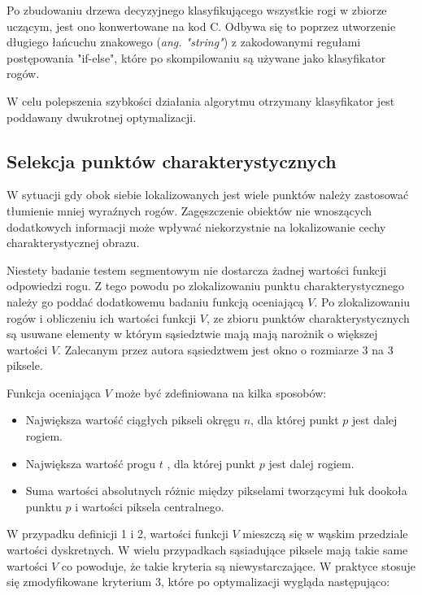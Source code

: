 Po zbudowaniu drzewa decyzyjnego klasyfikującego wszystkie rogi w zbiorze uczącym, jest ono konwertowane na kod C. Odbywa się to poprzez utworzenie długiego łańcuchu znakowego (\textit{ang. "string"}) z zakodowanymi regułami postępowania "if-else", które po skompilowaniu są używane jako klasyfikator rogów. 

W celu polepszenia szybkości działania algorytmu otrzymany klasyfikator jest poddawany dwukrotnej optymalizacji. 





\subsection{Selekcja punktów charakterystycznych}

W sytuacji gdy obok siebie lokalizowanych jest wiele punktów należy zastosować tłumienie mniej wyraźnych rogów. Zagęszczenie obiektów nie wnoszących dodatkowych informacji może wpływać niekorzystnie na lokalizowanie cechy charakterystycznej obrazu. 

Niestety badanie testem segmentowym nie dostarcza żadnej wartości funkcji odpowiedzi rogu. Z tego powodu po zlokalizowaniu punktu charakterystycznego należy go poddać dodatkowemu badaniu funkcją oceniającą $V$. Po zlokalizowaniu rogów i obliczeniu ich wartości funkcji $V$, ze zbioru punktów charakterystycznych są usuwane elementy w którym sąsiedztwie mają mają narożnik o większej wartości $V$. Zalecanym przez autora sąsiedztwem jest okno o rozmiarze 3 na 3 piksele.

Funkcja oceniająca $V$ może być zdefiniowana na kilka sposobów:
\begin{itemize}
\item Największa wartość ciągłych pikseli okręgu $n$, dla której punkt $p$ jest dalej rogiem.
\item Największa wartość progu $t$ , dla której punkt $p$ jest dalej rogiem.
\item Suma wartości absolutnych różnic między pikselami tworzącymi łuk dookoła punktu $p$ i wartości piksela centralnego.
\end{itemize}

W przypadku definicji 1 i 2, wartości funkcji $V$ mieszczą się w wąskim przedziale wartości dyskretnych. W wielu przypadkach sąsiadujące piksele mają takie same wartości $V$ co powoduje, że takie kryteria są niewystarczające. W praktyce stosuje się zmodyfikowane kryterium 3, które po optymalizacji wygląda następująco:



